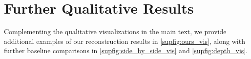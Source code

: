 



\section{Further Qualitative Results}
Complementing the qualitative visualizations in the main text, we provide additional examples of our reconstruction results in \cref{supfig:ours_vis}, along with further baseline comparisons in \cref{supfig:side_by_side_vis} and \cref{supfig:depth_vis}.





